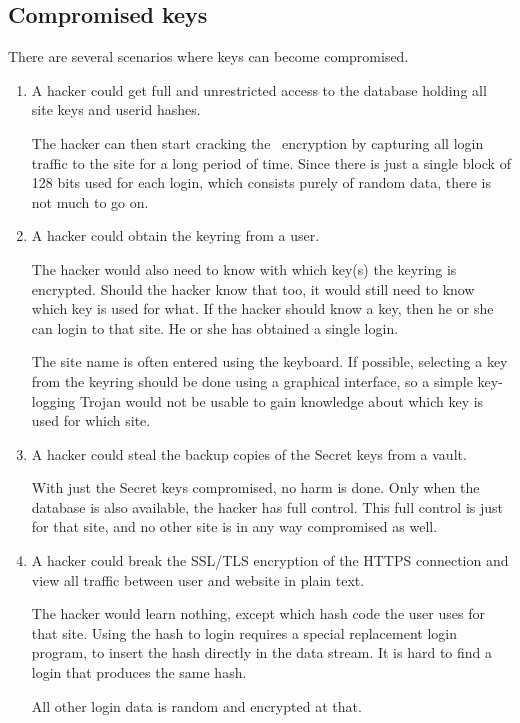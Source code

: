 \subsection{Compromised keys}
\label{sec:compromised}
There are several scenarios where keys can become compromised.
\begin{enumerate}
\item A hacker could get full and unrestricted access to the database holding all site keys and userid hashes.
\par
The hacker can then start cracking the \AES\ encryption by capturing all
login traffic to the site for a long period of time.
Since there is just a single block of 128 bits used for each login,
which consists purely of random data,
there is not much to go on.
\item A hacker could obtain the keyring from a user.
\par
The hacker would also need to know with which key(s) the keyring is encrypted.
Should the hacker know that too, it would still need to know which key is used for what.
If the hacker should know a key, then he or she can login to that site.
He or she has obtained a single login.
\par
The site name is often entered using the keyboard.
If possible,
selecting a key from the keyring should be done using a graphical interface,
so a simple key-logging Trojan would not be usable to gain knowledge about which key is used for which site.
\item A hacker could steal the backup copies of the Secret keys from a vault.
\par
With just the Secret keys compromised, no harm is done.
Only when the database is also available, the hacker has full control.
This full control is just for that site, and no other site is in any way compromised as well.
\item A hacker could break the SSL/TLS encryption of the HTTPS connection and
view all traffic between user and website in plain text.
\par
The hacker would learn nothing, except which \SHA hash code the user uses for that site.
Using the hash to login requires a special replacement login program, to insert the hash directly in the data stream.
It is hard to find a login that produces the same hash.
\par
All other login data is random and encrypted at that.
\end{enumerate}
